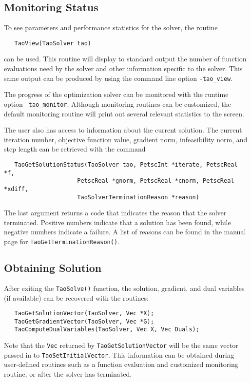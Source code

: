 \subsection{Monitoring Status}

To see parameters and performance statistics for the solver, the
routine
\begin{verbatim}
   TaoView(TaoSolver tao)
\end{verbatim}
can be used.  This routine will display to standard output the number
of function evaluations need by the solver and other information
specific to the solver.  This same output can be produced by using the 
command line option {\tt -tao\_view}.

The progress of the optimization solver can be monitored with
the runtime option {\tt -tao\_monitor}.  Although monitoring routines
can be customized, the default monitoring routine will print out 
several relevant statistics to the screen.

The user also has access to information about the current solution.
The current iteration number, objective function value, gradient
norm, infeasibility norm, and step length 
can be retrieved with the command 
\begin{verbatim}
   TaoGetSolutionStatus(TaoSolver tao, PetscInt *iterate, PetscReal *f,
                     PetscReal *gnorm, PetscReal *cnorm, PetscReal *xdiff,
                     TaoSolverTerminationReason *reason)
\end{verbatim}
\noindent
The last argument returns a code that indicates the reason that the solver 
terminated.  Positive 
numbers indicate that a solution has been found, while negative numbers
indicate a failure.  A list of reasons can be found in the manual page
for {\tt Tao\-Get\-Termination\-Reason()}.

\subsection{Obtaining Solution}

After exiting the {\tt Tao\-Solve()} function, the solution, gradient, and 
 dual variables (if available) can be recovered 
with the routines:
\begin{verbatim}
   TaoGetSolutionVector(TaoSolver, Vec *X);
   TaoGetGradientVector(TaoSolver, Vec *G);
   TaoComputeDualVariables(TaoSolver, Vec X, Vec Duals);
\end{verbatim}
\noindent
Note that the {\tt Vec} returned by {\tt TaoGetSolutionVector} will be
the same vector passed in to {\tt TaoSetInitialVector}.  This information 
can be obtained during user-defined routines such as a function evaluation 
and customized monitoring routine, or after the solver has terminated.

